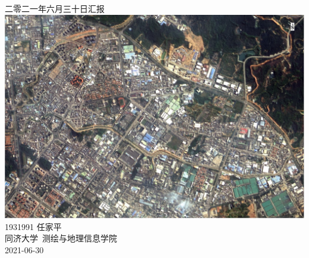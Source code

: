 \documentclass[a4paper, 12pt]{article}
\begin{document}
\begin{center}
    {\Huge 
        二零二一年六月三十日汇报}\\[20pt]
    
    \includegraphics[scale=0.4]{pic/cover.jpg} \\[15pt] 

    {\Large 
        1931991 任家平\\[12pt]
        同济大学~测绘与地理信息学院\\[12pt]
        2021-06-30}
\end{center}
\thispagestyle{empty}



\newpage
{}
\tableofcontents
\newpage
{}




\listoffigures
{}
\listoftables
{}
\newpage
\nocite{*}


\end{document}
